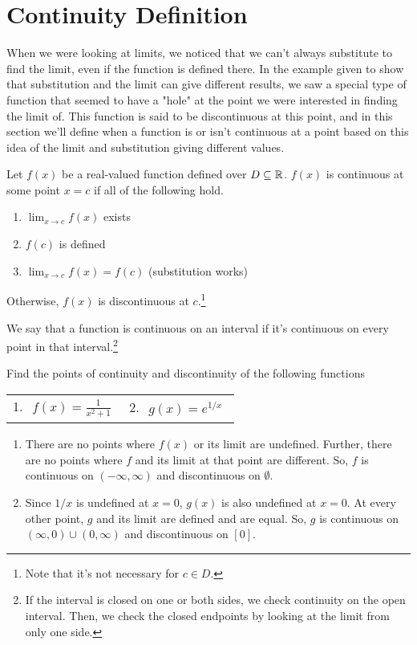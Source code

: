 \section{Continuity Definition}
When we were looking at limits, we noticed that we can't always substitute to find the limit, even if the function is defined there.
In the example given to show that substitution and the limit can give different results, we saw a special type of function that seemed to have a "hole" at the point we were interested in finding the limit of.
This function is said to be discontinuous at this point, and in this section we'll define when a function is or isn't continuous at a point based on this idea of the limit and substitution giving different values.

\begin{definition}
	Let $f(x)$ be a real-valued function defined over $D \subseteq \mathbb{R}$.
	$f(x)$ is continuous at some point $x = c$ if all of the following hold.
	\begin{enumerate}
		\item $\lim_{x \to c}{f(x)}$ exists
		\item $f(c)$ is defined
		\item $\lim_{x \to c}{f(x)} = f(c)$ (substitution works)
	\end{enumerate}
	Otherwise, $f(x)$ is discontinuous at $c$.\footnote{Note that it's not necessary for $c \in D$.}
\end{definition}

\noindent
We say that a function is continuous on an interval if it's continuous on every point in that interval.\footnote{If the interval is closed on one or both sides, we check continuity on the open interval. Then, we check the closed endpoints by looking at the limit from only one side.}

\begin{example}
	Find the points of continuity and discontinuity of the following functions
	\begin{table}[H]
	\begin{center}
	\begin{tabular}{ l l }
		1. $\begin{aligned}
			f(x) = \frac{1}{x^2+1}
		\end{aligned}$ &
		2. $\begin{aligned}
			g(x) = e^{1/x}
		\end{aligned}$
	\end{tabular}
	\end{center}
	\end{table}
\end{example}
\begin{enumerate}
	\item There are no points where $f(x)$ or its limit are undefined.
		Further, there are no points where $f$ and its limit at that point are different.
		So, $f$ is continuous on $(-\infty, \infty)$ and discontinuous on $\emptyset$.
	\item Since $1/x$ is undefined at $x = 0$, $g(x)$ is also undefined at $x=0$.
		At every other point, $g$ and its limit are defined and are equal.
		So, $g$ is continuous on $(\infty, 0) \cup (0, \infty)$ and discontinuous on $[0]$.
\end{enumerate}